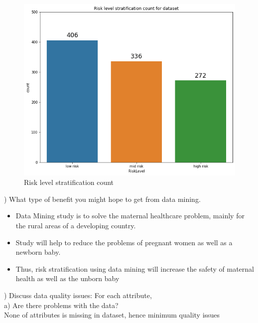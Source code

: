 \documentclass[12pt, letter]{article}
\begin{document}
\begin{figure}[h]
    \centering
    \includegraphics[scale = 0.7]{stats_risk.png}
    \caption{Risk level stratification count}
    \label{Risk_level_count}
\end{figure}


) What type of benefit you might hope to get from data mining. 

\begin{itemize}
    \item Data Mining study is to solve the maternal healthcare problem, mainly for the rural areas of a developing country.
    \item Study will help to reduce the problems of pregnant women as well as a newborn baby.
    \item Thus, risk stratification using data mining will increase the safety of maternal health as well as the unborn baby
\end{itemize}

\pagebreak
) Discuss data quality issues: For each attribute,\\

\noindent
a) Are there problems with the data? \\ 

None of attributes is missing in dataset, hence minimum quality issues \\
\end{document}
